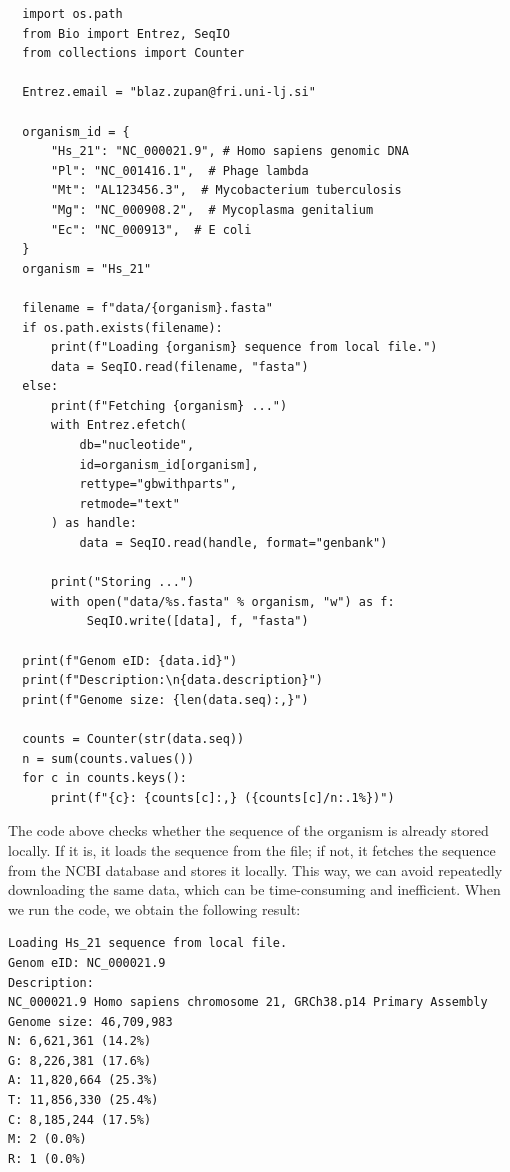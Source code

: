 \vspace*{3mm}
\begin{lstlisting}
  import os.path
  from Bio import Entrez, SeqIO
  from collections import Counter
  
  Entrez.email = "blaz.zupan@fri.uni-lj.si"
  
  organism_id = {
      "Hs_21": "NC_000021.9", # Homo sapiens genomic DNA
      "Pl": "NC_001416.1",  # Phage lambda
      "Mt": "AL123456.3",  # Mycobacterium tuberculosis
      "Mg": "NC_000908.2",  # Mycoplasma genitalium
      "Ec": "NC_000913",  # E coli
  }
  organism = "Hs_21"
  
  filename = f"data/{organism}.fasta"
  if os.path.exists(filename):
      print(f"Loading {organism} sequence from local file.")
      data = SeqIO.read(filename, "fasta")
  else:
      print(f"Fetching {organism} ...")
      with Entrez.efetch(
          db="nucleotide",
          id=organism_id[organism],
          rettype="gbwithparts",
          retmode="text"
      ) as handle:
          data = SeqIO.read(handle, format="genbank")
  
      print("Storing ...")
      with open("data/%s.fasta" % organism, "w") as f:
           SeqIO.write([data], f, "fasta")
  
  print(f"Genom eID: {data.id}")
  print(f"Description:\n{data.description}")
  print(f"Genome size: {len(data.seq):,}")
  
  counts = Counter(str(data.seq))
  n = sum(counts.values())
  for c in counts.keys():
      print(f"{c}: {counts[c]:,} ({counts[c]/n:.1%})")
\end{lstlisting}

The code above checks whether the sequence of the organism is already stored locally. If it is, it loads the sequence from the file; if not, it fetches the sequence from the NCBI database and stores it locally. This way, we can avoid repeatedly downloading the same data, which can be time-consuming and inefficient. When we run the code, we obtain the following result:

\vspace*{3mm}
\begin{lstlisting}
Loading Hs_21 sequence from local file.
Genom eID: NC_000021.9
Description: 
NC_000021.9 Homo sapiens chromosome 21, GRCh38.p14 Primary Assembly
Genome size: 46,709,983
N: 6,621,361 (14.2%)
G: 8,226,381 (17.6%)
A: 11,820,664 (25.3%)
T: 11,856,330 (25.4%)
C: 8,185,244 (17.5%)
M: 2 (0.0%)
R: 1 (0.0%)
\end{lstlisting}

